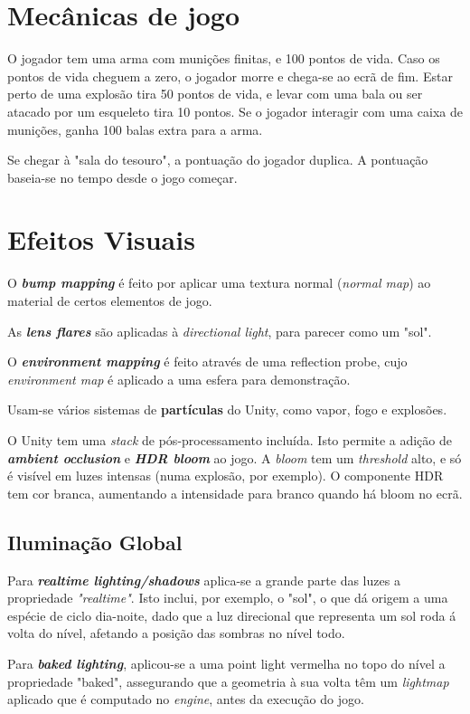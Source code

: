 \documentclass{article}
\begin{document}
    \section*{Mecânicas de jogo}
        \par
        O jogador tem uma arma com munições finitas, e 100 pontos de vida. Caso os pontos de vida cheguem a zero, o jogador morre e chega-se ao ecrã de fim. Estar perto de uma explosão tira 50 pontos de vida, e levar com uma bala ou ser atacado por um esqueleto tira 10 pontos. Se o jogador interagir com uma caixa de munições, ganha 100 balas extra para a arma.
        \par
        Se chegar à "sala do tesouro", a pontuação do jogador duplica. A pontuação baseia-se no tempo desde o jogo começar.
    \section*{Efeitos Visuais}
        \par
        O  \textbf{\textit{bump mapping}} é feito por aplicar uma textura normal (\textit{normal map}) ao material de certos elementos de jogo.
        \par
        As \textbf{\textit{lens flares}} são aplicadas à \textit{directional light}, para parecer como um "sol".
        \par
        O \textbf{\textit{environment mapping}} é feito através de uma reflection probe, cujo \textit{environment map} é aplicado a uma esfera para demonstração.
        \par
        Usam-se vários sistemas de \textbf{partículas} do Unity, como vapor, fogo e explosões.
        \par
        O Unity tem uma \textit{stack} de pós-processamento incluída. Isto permite a adição de \textbf{\textit{ambient occlusion}} e \textbf{\textit{HDR bloom}} ao jogo. A \textit{bloom} tem um \textit{threshold} alto, e só é visível em luzes intensas (numa explosão, por exemplo). O componente HDR tem cor branca, aumentando a intensidade para branco quando há bloom no ecrã.
        \subsection*{Iluminação Global}
        \par
        Para \textbf{\textit{realtime lighting/shadows}} aplica-se a grande parte das luzes a propriedade \textit{"realtime"}. Isto inclui, por exemplo, o "sol", o que dá origem a uma espécie de ciclo dia-noite, dado que a luz direcional que representa um sol roda á volta do nível, afetando a posição das sombras no nível todo.
        \par
        Para \textbf{\textit{baked lighting}}, aplicou-se a uma point light vermelha no topo do nível a propriedade "baked", assegurando que a geometria à sua volta têm um \textit{lightmap} aplicado que é computado no \textit{engine}, antes da execução do jogo.
\end{document}
